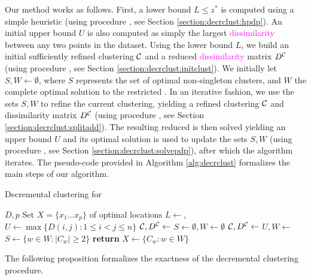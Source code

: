 \documentclass[ijoo,nonblindrev]{informs-ijoo}
\begin{document}
Our method works as follows. First, a lower bound $L \leq z^*$ is computed using a simple heuristic (using procedure , see Section \ref{section:decrclust:hpdp}). An initial upper bound $U$ is also computed as simply the largest \textcolor{magenta}{dissimilarity} between any two points in the dataset. Using the lower bound $L$, we build an initial sufficiently refined clustering $\mathcal{C}$ and a reduced \textcolor{magenta}{dissimilarity} matrix $D^{\mathcal{C}}$ (using procedure , see Section \ref{section:decrclust:initclust}). We initially let $S, W\leftarrow\emptyset$, where $S$ represents the set of optimal non-singleton clusters, and $W$ the complete optimal solution to the restricted \pDP{}. In an iterative fashion, we use the sets $S, W$ to refine the current clustering, yielding a refined clustering $\mathcal{C}$ and dissimilarity matrix $D^{\mathcal{C}}$ (using procedure , see Section \ref{section:decrclust:splitadd}). The resulting reduced \pDP{} is then solved yielding an upper bound $U$ and its optimal solution is used to update the sets $S, W$ (using procedure , see Section \ref{section:decrclust:solvepdp}), after which the algorithm iterates. The pseudo-code provided in 
Algorithm \ref{alg:decrclust} formalizes the main steps of our algorithm.%

\begin{algorithm}[H]
	\caption{Decremental clustering for \label{alg:decrclust}}
	\begin{algorithmic}\normalsize
		\Require $D, p$
		\Ensure Set $X = \{x_1\ldots x_p\}$ of optimal locations
		\State $L\leftarrow$, $U\leftarrow\max\{D(i, j): 1\leq i < j \leq n\}$
		\State $\mathcal{C}, D^{\mathcal{C}}\leftarrow$
		\State $S\leftarrow\emptyset, W\leftarrow\emptyset$
		\Repeat
			\State $\mathcal{C}, D^{\mathcal{C}}\leftarrow$
			\State $U, W\leftarrow$%
			\State $S\leftarrow\{w\in W : |C_w| \geq 2\}$
		\State \textbf{return} $X\leftarrow\{C_w: w\in W\}$
	\end{algorithmic}
\end{algorithm}

The following proposition formalizes the exactness of the decremental clustering procedure.
\end{document}
